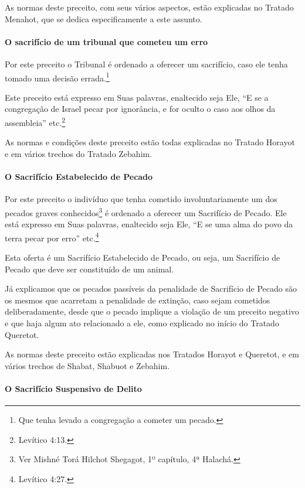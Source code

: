 As normas deste preceito, com seus vários aspectos, estão explicadas no
Tratado Menahot, que se dedica especificamente a este assunto.

\paragraph{O sacrifício de um tribunal que cometeu um erro}

Por este preceito o Tribunal é ordenado a oferecer um sacrifício, caso
ele tenha tomado uma decisão errada.\footnote{Que tenha levado a congregação a cometer um pecado.}

Este preceito está expresso em Suas palavras, enaltecido seja Ele, ``E
se a congregação de Israel pecar por ignorância, e for oculto o caso aos
olhos da assembleia'' etc.\footnote{Levítico 4:13.}

As normas e condições deste preceito estão todas explicadas no Tratado
Horayot e em vários trechos do Tratado Zebahim.

\paragraph{O Sacrifício Estabelecido de Pecado}

Por este preceito o indivíduo que
tenha cometido involuntariamente um dos pecados graves
conhecidos\footnote{Ver Mishné Torá Hilchot Shegagot, 1º capítulo, 4ª Halachá.} é ordenado a oferecer um Sacrifício de
Pecado. Ele está expresso em Suas palavras, enaltecido seja Ele, ``E se
uma alma do povo da terra pecar por erro'' etc.\footnote{Levítico 4:27.}

Esta oferta é um Sacrifício Estabelecido de Pecado, ou seja, um Sacrifício de Pecado que deve ser constituído de um animal.

Já explicamos que os pecados passíveis da penalidade de Sacrifício de
Pecado são os mesmos que acarretam a penalidade de extinção, caso sejam
cometidos deliberadamente, desde que o pecado implique a violação de um
preceito negativo e que haja algum ato relacionado a ele, como explicado
no início do Tratado Queretot.

As normas deste preceito estão explicadas nos Tratados Horayot e
Queretot, e em vários trechos de Shabat, Shabuot e Zebahim.

\paragraph{O Sacrifício Suspensivo de Delito}

